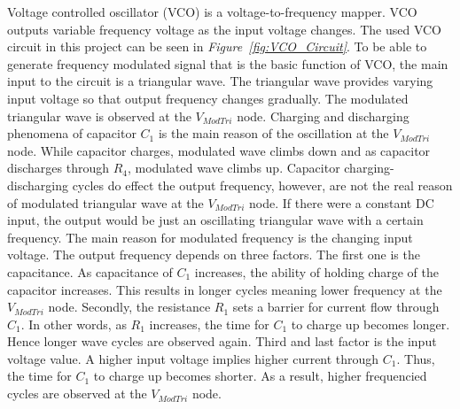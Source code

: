 \documentclass[paper]{IEEEtran}
\begin{document}
Voltage controlled oscillator (VCO) is a voltage-to-frequency mapper. VCO outputs variable frequency voltage as the input voltage changes. The used VCO circuit in this project can be seen in \textit{Figure~\ref{fig:VCO_Circuit}}. To be able to generate frequency modulated signal that is the basic function of VCO, the main input to the circuit is a triangular wave. The triangular wave provides varying input voltage so that output frequency changes gradually. The modulated triangular wave is observed at the $V_{ModTri}$ node. Charging and discharging phenomena of capacitor $C_{1}$ is the main reason of the oscillation at the $V_{ModTri}$ node. While capacitor charges, modulated wave climbs down and as capacitor discharges through $R_{4}$, modulated wave climbs up. Capacitor charging-discharging cycles do effect the output frequency, however, are not the real reason of modulated triangular wave at the $V_{ModTri}$ node. If there were a constant DC input, the output would be just an oscillating triangular wave with a certain frequency. The main reason for modulated frequency is the changing input voltage. The output frequency depends on three factors. The first one is the capacitance. As capacitance of $C_{1}$ increases, the ability of holding charge of the capacitor increases. This results in longer cycles meaning lower frequency at the $V_{ModTri}$ node. Secondly, the resistance $R_{1}$ sets a barrier for current flow through $C_{1}$. In other words, as $R_{1}$ increases, the time for $C_{1}$ to charge up becomes longer. Hence longer wave cycles are observed again. Third and last factor is the input voltage value. A higher input voltage implies higher current through $C_{1}$. Thus, the time for $C_{1}$ to charge up becomes shorter. As a result, higher frequencied cycles are observed at the $V_{ModTri}$ node.
\end{document}
